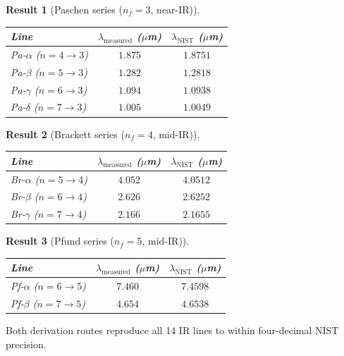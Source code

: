 \documentclass[11pt,a4paper]{article}
\theoremstyle{stmtstyle}
\newtheorem{result}{Result}
\theoremstyle{definition}
\theoremstyle{remark}
\begin{document}
\begin{result}[Paschen series ($n_{f}=3$, near-IR)]\label{res:paschen}
\begin{center}\small
\begin{tabular}{lcc}
\toprule
Line & $\lambda_{\mathrm{measured}}$ ($\mu$m) & $\lambda_{\mathrm{NIST}}$ ($\mu$m)\\
\midrule
Pa-$\alpha$ ($n=4\to 3$) & $1.875$ & $1.8751$\\
Pa-$\beta$ ($n=5\to 3$)  & $1.282$ & $1.2818$\\
Pa-$\gamma$ ($n=6\to 3$) & $1.094$ & $1.0938$\\
Pa-$\delta$ ($n=7\to 3$) & $1.005$ & $1.0049$\\
\bottomrule
\end{tabular}
\end{center}
\end{result}

\begin{result}[Brackett series ($n_{f}=4$, mid-IR)]\label{res:brackett}
\begin{center}\small
\begin{tabular}{lcc}
\toprule
Line & $\lambda_{\mathrm{measured}}$ ($\mu$m) & $\lambda_{\mathrm{NIST}}$ ($\mu$m)\\
\midrule
Br-$\alpha$ ($n=5\to 4$) & $4.052$ & $4.0512$\\
Br-$\beta$ ($n=6\to 4$)  & $2.626$ & $2.6252$\\
Br-$\gamma$ ($n=7\to 4$) & $2.166$ & $2.1655$\\
\bottomrule
\end{tabular}
\end{center}
\end{result}

\begin{result}[Pfund series ($n_{f}=5$, mid-IR)]\label{res:pfund}
\begin{center}\small
\begin{tabular}{lcc}
\toprule
Line & $\lambda_{\mathrm{measured}}$ ($\mu$m) & $\lambda_{\mathrm{NIST}}$ ($\mu$m)\\
\midrule
Pf-$\alpha$ ($n=6\to 5$) & $7.460$ & $7.4598$\\
Pf-$\beta$ ($n=7\to 5$)  & $4.654$ & $4.6538$\\
\bottomrule
\end{tabular}
\end{center}
\end{result}

Both derivation routes reproduce all 14 IR lines to within four-decimal NIST precision.
\end{document}
